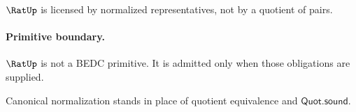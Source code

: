\begin{corollary}
\label{cor:rat-licensed-not-primitive}
\(\RatUp\) is licensed by normalized representatives, not by a quotient of pairs.
\end{corollary}

\paragraph{Primitive boundary.}
\(\RatUp\) is not a BEDC primitive. It is admitted only when those obligations are supplied.

\begin{remark}
\label{rem:rat-zero-axiom-note}
Canonical normalization stands in place of quotient equivalence and \(\mathsf{Quot.sound}\).
\end{remark}
